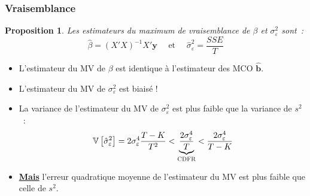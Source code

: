 \documentclass[10pt]{beamer}
\theoremstyle{plain}
\newtheorem{prop}{Proposition}
\begin{document}
\begin{frame}
  \frametitle{Vraisemblance}

  \begin{prop}\label{prop:ml}
    Les estimateurs du maximum de vraisemblance de $\beta$ et $\sigma_{\varepsilon}^2$ sont~:
    \[
      \hat\beta = (X'X)^{-1}X'\mathbf y \quad\text{ et }\quad \hat{\sigma}_{\varepsilon}^2 = \frac{SSE}{T}
    \]
  \end{prop}

  \begin{itemize}

  \item L'estimateur du MV de $\beta$ est identique à l'estimateur des MCO $\hat{\mathbf b}$.\newline

  \item L'estimateur du MV de $\sigma_{\varepsilon}^{2}$ est biaisé !\newline

  \item La variance de l'estimateur du MV de $\sigma_{\varepsilon}^{2}$ est plus faible que la variance de $s^2$~:
    \[
      \mathbb V\left[ \hat{\sigma}_{\varepsilon}^2 \right] = 2\sigma_{\varepsilon}^4\frac{T-K}{T^2} < \underbrace{\frac{2\sigma_{\varepsilon}^4}{T}}_{\textsc{CDFR}}< \frac{2\sigma_{\varepsilon}^4}{T-K}
    \]
  \item \underline{\textbf{Mais}} l'erreur quadratique moyenne de l'estimateur du MV est plus faible que celle de $s^2$.

  \end{itemize}

\end{frame}
\end{document}
